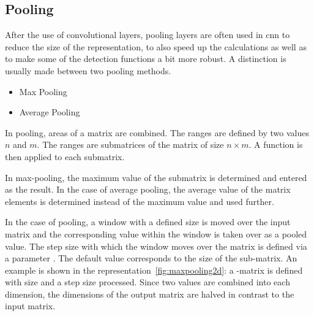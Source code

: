 {\begin{figure}
\end{figure}





\subsection{Pooling}


After the use of convolutional layers, pooling layers are often used in \ac{cnn} to reduce the size of the representation, to also speed up the calculations as well as to make some of the detection functions a bit more robust. A distinction is usually made between two pooling methods.

\begin{itemize}
  \item Max Pooling
  \item Average Pooling
\end{itemize}

In pooling, areas of a matrix are combined. The ranges are defined by two values $n$ and $m$. The ranges are submatrices of the matrix of size $n \times m$. A function is then applied to each submatrix.

In max-pooling, the maximum value of the submatrix is determined and entered as the result. In the case of average pooling, the average value of the matrix elements is determined instead of the maximum value and used further.


In the case of pooling, a window with a defined size is moved over the input matrix and the corresponding value within the window is taken over as a pooled value. The step size with which the window moves over the matrix is defined via a parameter \cite{Dumoulin:2016}. The default value corresponds to the size of the sub-matrix. An example is shown in the representation~\ref{fig:maxpooling2d}: a -matrix is defined with size    and a step size   processed. Since two values are combined into each dimension, the dimensions of the output matrix are halved in contrast to the input matrix. \cite{Britz:2015}

\begin{figure}[htb]
    \centering
    
    \def\yspacing{.75em}
\end{figure}}
